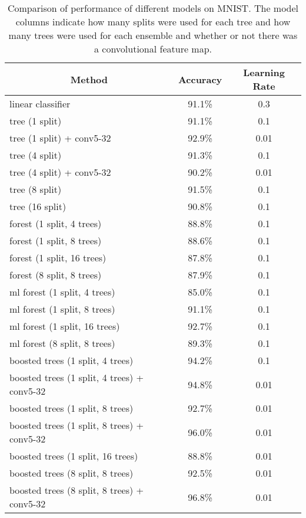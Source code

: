 \documentclass[a4paper,11pt,final]{article}
\begin{document}
\begin{table}[]
\centering
\begin{tabular}{@{}lcc@{}}
\toprule
\multicolumn{1}{c}{Method}                  & Accuracy & Learning Rate \\ \midrule
linear classifier                           & 91.1\%   & 0.3           \\
tree (1 split)                              & 91.1\%   & 0.1           \\
tree (1 split) + conv5-32                   & 92.9\%   & 0.01          \\
tree (4 split)                              & 91.3\%   & 0.1           \\
tree (4 split) + conv5-32                   & 90.2\%   & 0.01          \\
tree (8 split)                              & 91.5\%   & 0.1           \\
tree (16 split)                             & 90.8\%   & 0.1           \\
forest (1 split, 4 trees)                   & 88.8\%   & 0.1           \\
forest (1 split, 8 trees)                   & 88.6\%   & 0.1           \\
forest (1 split, 16 trees)                  & 87.8\%   & 0.1           \\
forest (8 split, 8 trees)                   & 87.9\%   & 0.1           \\
ml forest (1 split, 4 trees)                & 85.0\%   & 0.1           \\
ml forest (1 split, 8 trees)                & 91.1\%   & 0.1           \\
ml forest (1 split, 16 trees)               & 92.7\%   & 0.1           \\
ml forest (8 split, 8 trees)                & 89.3\%   & 0.1           \\
boosted trees (1 split, 4 trees)            & 94.2\%   & 0.1           \\
boosted trees (1 split, 4 trees) + conv5-32 & 94.8\%   & 0.01          \\
boosted trees (1 split, 8 trees)            & 92.7\%   & 0.01          \\
boosted trees (1 split, 8 trees) + conv5-32 & 96.0\%   & 0.01          \\
boosted trees (1 split, 16 trees)           & 88.8\%   & 0.01          \\
boosted trees (8 split, 8 trees)            & 92.5\%   & 0.01          \\
boosted trees (8 split, 8 trees) + conv5-32 & 96.8\%   & 0.01          \\ \bottomrule
\end{tabular}
\caption{Comparison of performance of different models on MNIST. The model columns indicate how many splits were used for each tree and how many trees were used for each ensemble and whether or not there was a convolutional feature map.}
\label{tab:results}
\end{table}
\end{document}

